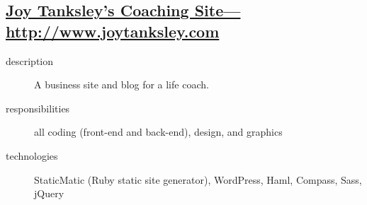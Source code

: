\documentclass{article}
\begin{document}

\subsection{\href{http://www.joytanksley.com}
  {Joy Tanksley's Coaching Site---http://www.joytanksley.com}}
\label{sub:Joy Tanksley's Coaching Site}

\begin{multicols}{2}

\begin{description}
  \item[description] A business site and blog for a life coach. 
  \item[responsibilities] all coding (front-end and back-end), design, and graphics 
  \item[technologies] StaticMatic (Ruby static site generator), WordPress, Haml, Compass, Sass, jQuery 
\end{description}

\vfill
\columnbreak
{}
\end{multicols}
\end{document}
